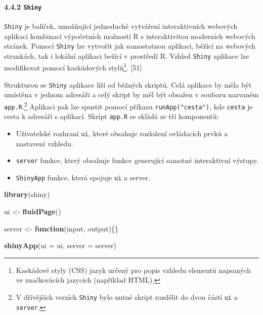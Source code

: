 \documentclass[12pt,]{article}
\newenvironment{Shaded}{\begin{snugshade}}{\end{snugshade}}
\newcommand{\KeywordTok}[1]{\textcolor[rgb]{0.13,0.29,0.53}{\textbf{#1}}}
\newcommand{\DataTypeTok}[1]{\textcolor[rgb]{0.13,0.29,0.53}{#1}}
\newcommand{\StringTok}[1]{\textcolor[rgb]{0.31,0.60,0.02}{#1}}
\newcommand{\ControlFlowTok}[1]{\textcolor[rgb]{0.13,0.29,0.53}{\textbf{#1}}}
\newcommand{\NormalTok}[1]{#1}
\providecommand{\tightlist}{%
  \setlength{\itemsep}{0pt}\setlength{\parskip}{0pt}}
\let\oldparagraph\paragraph
\renewcommand{\paragraph}[1]{\oldparagraph{#1}\mbox{}}
\let\rmarkdownfootnote\footnote%
\def\footnote{\protect\rmarkdownfootnote}
\begin{document}
\hypertarget{shiny}{\paragraph{\texorpdfstring{4.4.2
\texttt{Shiny}}{4.4.2 Shiny}}\label{shiny}}

\qquad \texttt{Shiny} je balíček, umožňující jednoduché vytváření
interaktivních webových aplikací kombinací výpočetních možností R s
interaktivitou moderních webových stránek. Pomocí \texttt{Shiny} lze
vytvořit jak samostatnou aplikaci, běžící na webových strankách, tak i
lokální aplikaci bežící v prostředí R. Vzhled \texttt{Shiny} aplikace
lze modifikovat pomocí kaskádových stylů\footnote{Kaskádové styly (CSS)
  jazyk určený pro popis vzhledu elementů napsaných ve značkovácích
  jazycích (například HTML).}. {[}51{]}

\qquad Strukturou se \texttt{Shiny} aplikace líší od běžných skriptů.
Celá aplikace by měla být umístěna v jednom adresáři a celý skript by
měl být obsažen v souboru nazvaném \texttt{app.R}.\footnote{V dřívějších
  verzích \texttt{Shiny} bylo nutné skript rozdělit do dvou částí
  \texttt{ui} a \texttt{server}.} Aplikaci pak lze spustit pomocí
příkazu \texttt{runApp("cesta")}, kde \texttt{cesta} je cesta k adresáři
s aplikací. Skript \texttt{app.R} se skládá ze tří komponentů:

\begin{itemize}
\tightlist
\item
  Uživatelské rozhraní \texttt{ui}, které obsahuje rozložení ovládacích
  prvků a nastavení vzhledu.
\item
  \texttt{server} funkce, který obsahuje funkce generující samotné
  interaktivní výstupy.
\item
  \texttt{ShinyApp} funkce, která spojuje \texttt{ui} a server. \newline
\end{itemize}

\begin{Shaded}
\begin{Highlighting}[]
\KeywordTok{library}\NormalTok{(shiny)}

\NormalTok{ui <-}\StringTok{ }\KeywordTok{fluidPage}\NormalTok{()}

\NormalTok{server <-}\StringTok{ }\ControlFlowTok{function}\NormalTok{(input, output)\{\}}

\KeywordTok{shinyApp}\NormalTok{(}\DataTypeTok{ui =}\NormalTok{ ui, }\DataTypeTok{server =}\NormalTok{ server)}
\end{Highlighting}
\end{Shaded}
\end{document}
